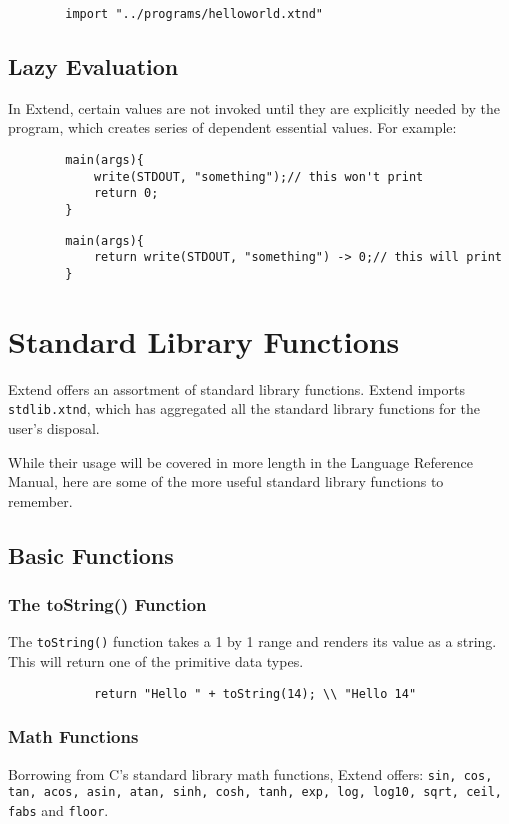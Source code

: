 	\begin{lstlisting}
		import "../programs/helloworld.xtnd"
	\end{lstlisting}

	\subsection{Lazy Evaluation}
	In Extend, certain values are not invoked until they are explicitly needed by the program, which creates series of dependent essential values. For example:

	\begin{lstlisting}
		main(args){
			write(STDOUT, "something");// this won't print
			return 0;
		}
	\end{lstlisting}
	\begin{lstlisting}
		main(args){
			return write(STDOUT, "something") -> 0;// this will print
		}
	\end{lstlisting}

\section{Standard Library Functions}
Extend offers an assortment of standard library functions. Extend imports \texttt{stdlib.xtnd}, which has aggregated all the standard library functions for the user's disposal.

\medskip \noindent
While their usage will be covered in more length in the Language Reference Manual, here are some of the more useful standard library functions to remember.
	\subsection{Basic Functions}
		\subsubsection{The toString() Function}
		The \texttt{toString()} function takes a 1 by 1 range and renders its value as a string. This will return one of the primitive data types.

		\begin{lstlisting}
			return "Hello " + toString(14); \\ "Hello 14"
		\end{lstlisting}

		\subsubsection{Math Functions}
		Borrowing from C's standard library math functions, Extend offers: \texttt{sin, cos, tan, acos, asin, atan, sinh, cosh, tanh, exp, log, log10, sqrt, ceil, fabs} and \texttt{floor}.

